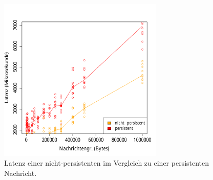 \begin{figure}
\center
  \includegraphics[width=0.7\textwidth]{images/measurement/persistentVsNonPersistent.pdf}
  \caption{Latenz einer nicht-persistenten im Vergleich zu einer persistenten Nachricht.}
  \label{img:senderatepersisten}
\end{figure}
